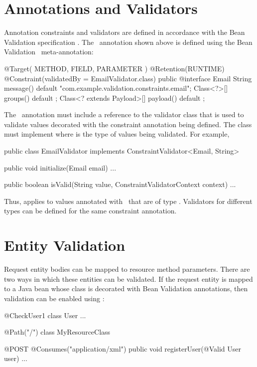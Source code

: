 \section{Annotations and Validators}

Annotation constraints and validators are defined in accordance with the Bean Validation specification \cite{bv11}. The \Email\ annotation shown above is defined using the Bean Validation \Constraint\ meta-annotation:

\begin{listing}{1}
@Target( { METHOD, FIELD, PARAMETER })
@Retention(RUNTIME)
@Constraint(validatedBy = EmailValidator.class)
public @interface Email {
    String message() default "{com.example.validation.constraints.email}"; 
    Class<?>[] groups() default {};
    Class<? extends Payload>[] payload() default {};
}
\end{listing}

The \Constraint\ annotation must include a reference to the validator class that is used to validate values decorated with the constraint annotation being defined. The  class must implement  where  is the type of values being validated. For example, 

\begin{listing}{1}
public class EmailValidator implements ConstraintValidator<Email, String> {
    public void initialize(Email email) { 
        ...
    }

    public boolean isValid(String value, ConstraintValidatorContext context) {
        ...
    }
}
\end{listing}

Thus,  applies to values annotated with \Email\ that are of type . Validators for different types can be defined for the same constraint annotation. 

\section{Entity Validation}

Request entity bodies can be mapped to resource method parameters. There are two ways in which these entities can be validated. If the request entity is mapped to a Java bean whose class is decorated with Bean Validation annotations, then validation can be enabled using \Valid:

\begin{listing}{1}
@CheckUser1
class User { ... }

@Path("/")
class MyResourceClass {

    @POST
    @Consumes("application/xml")
    public void registerUser(@Valid User user) {
        ...
    }
}
\end{listing}

